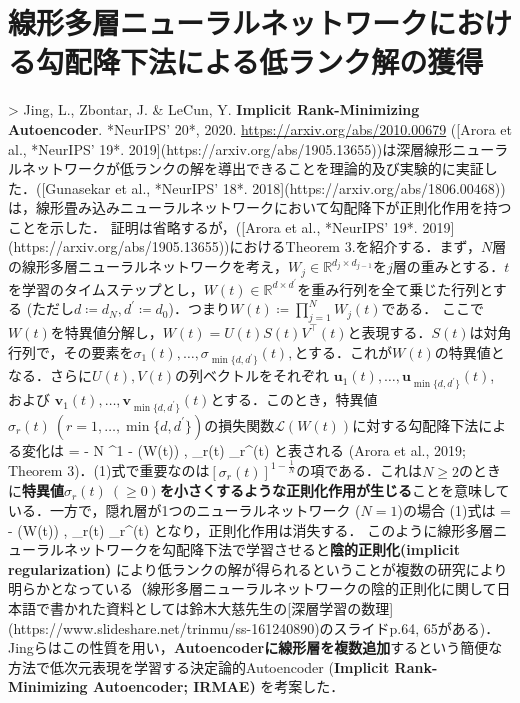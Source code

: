 \section{線形多層ニューラルネットワークにおける勾配降下法による低ランク解の獲得}
> Jing, L., Zbontar, J. & LeCun, Y. \textbf{Implicit Rank-Minimizing Autoencoder}. *NeurIPS' 20*, 2020. \url{https://arxiv.org/abs/2010.00679}
([Arora et al., *NeurIPS' 19*. 2019](https://arxiv.org/abs/1905.13655))は深層線形ニューラルネットワークが低ランクの解を導出できることを理論的及び実験的に実証した．([Gunasekar et al., *NeurIPS' 18*. 2018](https://arxiv.org/abs/1806.00468))は，線形畳み込みニューラルネットワークにおいて勾配降下が正則化作用を持つことを示した．
証明は省略するが，([Arora et al., *NeurIPS' 19*. 2019](https://arxiv.org/abs/1905.13655))におけるTheorem 3.を紹介する．まず，$N$層の線形多層ニューラルネットワークを考え，$W_j \in \mathbb{R}^{d_j \times d_{j−1}}$を$j$層の重みとする．$t$を学習のタイムステップとし，$W(t) \in \mathbb{R}^{d \times d^\prime}$を重み行列を全て乗じた行列とする (ただし$d \coloneqq  d_N, d^\prime \coloneqq  d_0$)．つまり$W(t)\coloneqq \prod_{j=1}^N W_j(t)$である．
ここで$W(t)$を特異値分解し，$W(t) = U(t)S(t)V^\top(t)$と表現する．$S(t)$は対角行列で，その要素を$\sigma_1(t), \ldots , \sigma_{\min\{d, d^\prime\}}(t),$とする．これが$W(t)$の特異値となる．さらに$U(t), V (t)$の列ベクトルをそれぞれ $\mathbf{u}_1(t), \ldots, \mathbf{u}_{\min\{d, d^\prime\}}(t)$, および $\mathbf{v}_1(t), \ldots, \mathbf{v}_{\min\{d,d^\prime \}}(t)$とする．このとき，特異値$ \sigma_r(t)\ (r=1, \ldots, \min\{d,d^\prime \})$の損失関数$\mathcal{L}(W(t))$に対する勾配降下法による変化は
 = - N \cdot {}^{1 - } \cdot \left\langle \nabla {}(W(t)) , _r(t) _r^\top(t) \right\rangle
と表される (Arora et al., 2019; Theorem 3)．(1)式で重要なのは$\left[\sigma_r(t)\right]^{1 - \frac{1}{N}}$の項である．これは$N\geq 2$のときに\textbf{特異値$\sigma_r(t)\ (\geq 0)$を小さくするような正則化作用が生じる}ことを意味している．一方で，隠れ層が1つのニューラルネットワーク ($N=1$)の場合 (1)式は
 = - \left\langle \nabla {}(W(t)) , _r(t) _r^\top(t) \right\rangle
となり，正則化作用は消失する．
このように線形多層ニューラルネットワークを勾配降下法で学習させると\textbf{陰的正則化(implicit regularization)} により低ランクの解が得られるということが複数の研究により明らかとなっている（線形多層ニューラルネットワークの陰的正則化に関して日本語で書かれた資料としては鈴木大慈先生の[深層学習の数理](https://www.slideshare.net/trinmu/ss-161240890)のスライドp.64, 65がある)．Jingらはこの性質を用い，\textbf{Autoencoderに線形層を複数追加}するという簡便な方法で低次元表現を学習する決定論的Autoencoder (\textbf{Implicit Rank-Minimizing Autoencoder; IRMAE)} を考案した．
